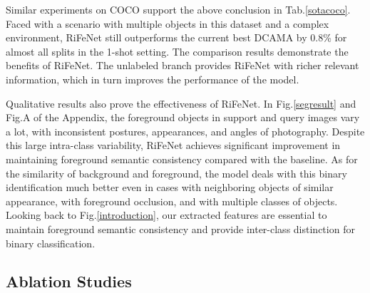 \documentclass[letterpaper]{article} %
\begin{document}
Similar experiments on COCO support the above conclusion in Tab.\ref{sotacoco}. Faced with a scenario with multiple objects in this dataset and a complex environment, RiFeNet still outperforms the current best DCAMA by 0.8\% for almost all splits in the 1-shot setting. The comparison results demonstrate the benefits of RiFeNet. The unlabeled branch provides RiFeNet with richer relevant information, which in turn improves the performance of the model.

Qualitative results also prove the effectiveness of RiFeNet. In Fig.\ref{segresult} and Fig.A of the Appendix, the foreground objects in support and query images vary a lot, with inconsistent postures, appearances, and angles of photography. Despite this large intra-class variability, RiFeNet achieves significant improvement in maintaining foreground semantic consistency compared with the baseline. As for the similarity of background and foreground, the model deals with this binary identification much better even in cases with neighboring objects of similar appearance, with foreground occlusion, and with multiple classes of objects. Looking back to Fig.\ref{introduction}, our extracted features are essential to maintain foreground semantic consistency and provide inter-class distinction for binary classification.

\subsection{Ablation Studies}
\end{document}
